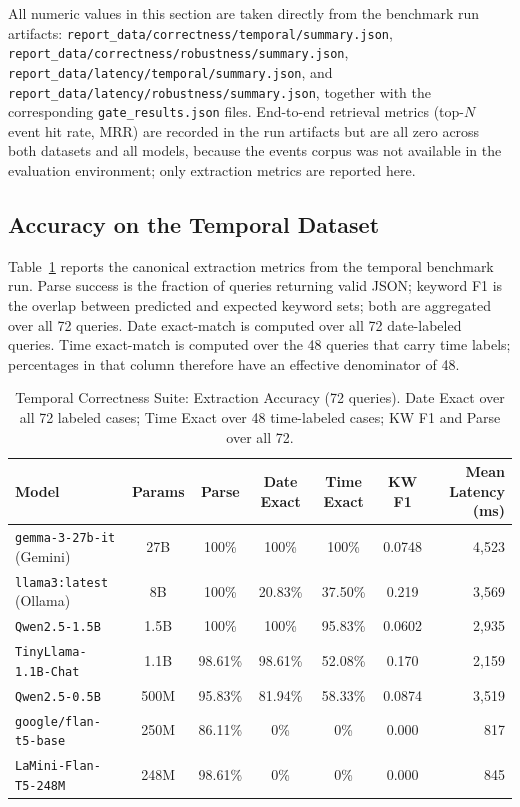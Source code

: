 \documentclass[conference]{IEEEtran}
\begin{document}
All numeric values in this section are taken directly from the benchmark run artifacts: \texttt{report\_data/correctness/temporal/summary.json}, \texttt{report\_data/correctness/robustness/summary.json}, \texttt{report\_data/latency/temporal/summary.json}, and \texttt{report\_data/latency/robustness/summary.json}, together with the corresponding \texttt{gate\_results.json} files. End-to-end retrieval metrics (top-$N$ event hit rate, MRR) are recorded in the run artifacts but are all zero across both datasets and all models, because the events corpus was not available in the evaluation environment; only extraction metrics are reported here.

\subsection{Accuracy on the Temporal Dataset}

Table~\ref{table:temporal_accuracy} reports the canonical extraction metrics from the temporal benchmark run. Parse success is the fraction of queries returning valid JSON; keyword F1 is the overlap between predicted and expected keyword sets; both are aggregated over all 72 queries. Date exact-match is computed over all 72 date-labeled queries. Time exact-match is computed over the 48 queries that carry time labels; percentages in that column therefore have an effective denominator of 48.

\begin{table}[t]
    \centering
    \caption{Temporal Correctness Suite: Extraction Accuracy (72 queries). Date Exact over all 72 labeled cases; Time Exact over 48 time-labeled cases; KW F1 and Parse over all 72.}
    \begin{tabular}{lcccccr}
        \toprule
        \textbf{Model} & \textbf{Params} & \textbf{Parse} & \textbf{Date Exact} & \textbf{Time Exact} & \textbf{KW F1} & \textbf{Mean Latency (ms)} \\
        \midrule
        \texttt{gemma-3-27b-it} (Gemini)    & 27B   & 100\%   & 100\%   & 100\%   & 0.0748 & 4{,}523 \\
        \texttt{llama3:latest} (Ollama)     & 8B    & 100\%   & 20.83\% & 37.50\% & 0.219  & 3{,}569 \\
        \texttt{Qwen2.5-1.5B}               & 1.5B  & 100\%   & 100\%   & 95.83\% & 0.0602 & 2{,}935 \\
        \texttt{TinyLlama-1.1B-Chat}        & 1.1B  & 98.61\% & 98.61\% & 52.08\% & 0.170  & 2{,}159 \\
        \texttt{Qwen2.5-0.5B}               & 500M  & 95.83\% & 81.94\% & 58.33\% & 0.0874 & 3{,}519 \\
        \texttt{google/flan-t5-base}        & 250M  & 86.11\% & 0\%     & 0\%     & 0.000  & 817     \\
        \texttt{LaMini-Flan-T5-248M}        & 248M  & 98.61\% & 0\%     & 0\%     & 0.000  & 845     \\
        \bottomrule
    \end{tabular}
    \label{table:temporal_accuracy}
\end{table}
\end{document}
